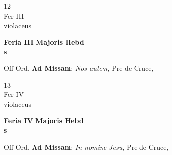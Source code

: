 \documentclass[10pt, openany]{book}
\begin{document}
        \begin{center}
            \begin{minipage}{3.5in}
                \vspace{2em}
                \begin{minipage}{0.5in}
                    {\Huge 12} \\
                    {\normalsize Fer III} \\
                    {\normalsize violaceus}
                \end{minipage}
                \begin{minipage}{3.0in}
                    \textbf{ \large Feria III Majoris Hebd \\
                    \textnormal{\normalsize s}} \\ 
                \end{minipage}
                \begin{justify}Off Ord, \textbf{Ad Missam}: \textit{Nos autem,} Pre de Cruce,  
                \end{justify}
            \end{minipage}
        \end{center}
    
        \begin{center}
            \begin{minipage}{3.5in}
                \vspace{2em}
                \begin{minipage}{0.5in}
                    {\Huge 13} \\
                    {\normalsize Fer IV} \\
                    {\normalsize violaceus}
                \end{minipage}
                \begin{minipage}{3.0in}
                    \textbf{ \large Feria IV Majoris Hebd \\
                    \textnormal{\normalsize s}} \\ 
                \end{minipage}
                \begin{justify}Off Ord, \textbf{Ad Missam}: \textit{In nomine Jesu,} Pre de Cruce,  
                \end{justify}
            \end{minipage}
        \end{center}
    
\end{document}
